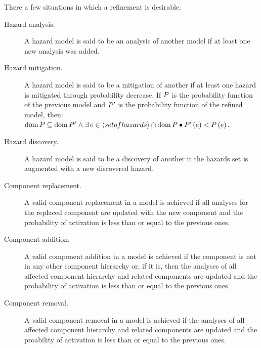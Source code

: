 There a few situations in which a refinement is desirable:
\begin{description}
  \item[Hazard analysis.] A hazard model is said to be an analysis of another model if at least one new analysis was added.
  \item[Hazard mitigation.] A hazard model is said to be a mitigation of another if at least one hazard is mitigated through probability decrease. If $P$ is the probability function of the previous model and $P'$ is the probability function of the refined model, then: 
%
\\$\hmdom{\hmprobabilitysymbol} \subseteq \hmdom{\hmprobabilitysymbol'} \land%
\hmexists{e \in \hminter{\hmseqenum{set of hazards}}{\hmdom{\hmprobabilitysymbol}}}{%
\hmprobability[\hmprobabilitysymbol']{e} < \hmprobability{e}%
}$.
  \item[Hazard discovery.] A hazard model is said to be a discovery of another it the hazards set is augmented with a new discovered hazard.
  \item[Component replacement.] A valid component replacement in a model is achieved if all analyses for the replaced component are updated with the new component and the probability of activation is less than or equal to the previous ones.
  \item[Component addition.] A valid component addition in a model is achieved if the component is not in any other component hierarchy or, if it is, then the analyses of all affected component hierarchy and related components are updated and the probability of activation is less than or equal to the previous ones.
  \item[Component removal.] A valid component removal in a model is achieved if the analyses of all affected component hierarchy and related components are updated and the proability of activation is less than or equal to the previous ones. 
\end{description}

